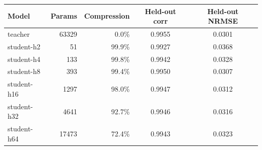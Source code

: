 \begin{tabular}{lrrcc}
\toprule
Model & Params & Compression & Held-out corr & Held-out NRMSE \\
\midrule
teacher & 63329 & 0.0\% & 0.9955 & 0.0301 \\
student-h2 & 51 & 99.9\% & 0.9927 & 0.0368 \\
student-h4 & 133 & 99.8\% & 0.9942 & 0.0328 \\
student-h8 & 393 & 99.4\% & 0.9950 & 0.0307 \\
student-h16 & 1297 & 98.0\% & 0.9947 & 0.0312 \\
student-h32 & 4641 & 92.7\% & 0.9946 & 0.0316 \\
student-h64 & 17473 & 72.4\% & 0.9943 & 0.0323 \\
\bottomrule
\end{tabular}
